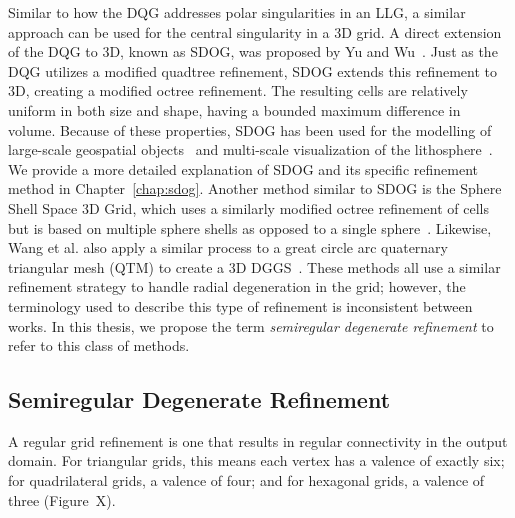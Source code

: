Similar to how the DQG addresses polar singularities in an LLG, a similar approach can be used for the central singularity in a 3D grid.
A direct extension of the DQG to 3D, known as SDOG, was proposed by Yu and Wu~\cite{yu2009sdog}.
Just as the DQG utilizes a modified quadtree refinement, SDOG extends this refinement to 3D, creating a modified octree refinement.
The resulting cells are relatively uniform in both size and shape, having a bounded maximum difference in volume.
Because of these properties, SDOG has been used for the modelling of large-scale geospatial objects~\cite{yu2012large-scale} and multi-scale visualization of the lithosphere~\cite{yu2012lithosphere}.
We provide a more detailed explanation of SDOG and its specific refinement method in Chapter~\ref{chap:sdog}.
Another method similar to SDOG is the Sphere Shell Space 3D Grid, which uses a similarly modified octree refinement of cells but is based on multiple sphere shells as opposed to a single sphere~\cite{gang2013sphere}.
Likewise, Wang et al. also apply a similar process to a great circle arc quaternary triangular mesh (QTM) to create a 3D DGGS~\cite{wang2013global}.
These methods all use a similar refinement strategy to handle radial degeneration in the grid; however, the terminology used to describe this type of refinement is inconsistent between works.
In this thesis, we propose the term \textit{semiregular degenerate refinement} to refer to this class of methods.


\subsection{Semiregular Degenerate Refinement} \label{chap:3:semiregDegen}
A regular grid refinement is one that results in regular connectivity in the output domain.
For triangular grids, this means each vertex has a valence of exactly six; for quadrilateral grids, a valence of four; and for hexagonal grids, a valence of three (Figure~X).


